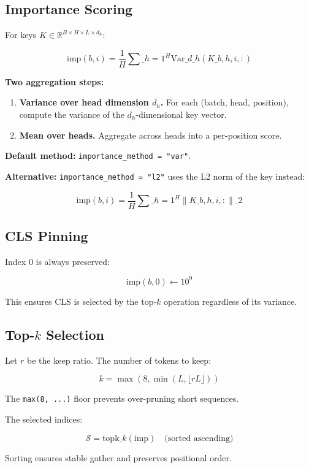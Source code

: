 \subsection{Importance Scoring}

For keys $K \in \mathbb{R}^{B \times H \times L \times d_h}$:

\[
\text{imp}(b, i) = \frac{1}{H} \sum\_{h=1}^{H} \text{Var}\_{d\_h}(K\_{b,h,i,:})
\tag{4.1}
\]

\textbf{Two aggregation steps:}
\begin{enumerate}
\item \textbf{Variance over head dimension $d_h$.} For each (batch, head, position),
  compute the variance of the $d_h$-dimensional key vector.
\item \textbf{Mean over heads.} Aggregate across heads into a per-position score.

\end{enumerate}
\textbf{Default method:} \texttt{importance\_method = "var"}.

\textbf{Alternative:} \texttt{importance\_method = "l2"} uses the L2 norm of the key 
instead:

\[
\text{imp}(b, i) = \frac{1}{H} \sum\_{h=1}^{H} \|K\_{b,h,i,:}\|\_2
\tag{4.2}
\]

\subsection{CLS Pinning}

Index 0 is always preserved:

\[
\text{imp}(b, 0) \leftarrow 10^9
\tag{4.3}
\]

This ensures CLS is selected by the top-$k$ operation regardless of its 
variance.

\subsection{Top-$k$ Selection}

Let $r$ be the keep ratio. The number of tokens to keep:

\[
k = \max\!\left(8, \min\!\left(L, \lfloor r L \rfloor\right)\right)
\tag{4.4}
\]

The \texttt{max(8, ...)} floor prevents over-pruning short sequences.

The selected indices:

\[
\mathcal{S} = \text{topk}\_k(\text{imp}) \quad \text{(sorted ascending)}
\tag{4.5}
\]

Sorting ensures stable gather and preserves positional order.

